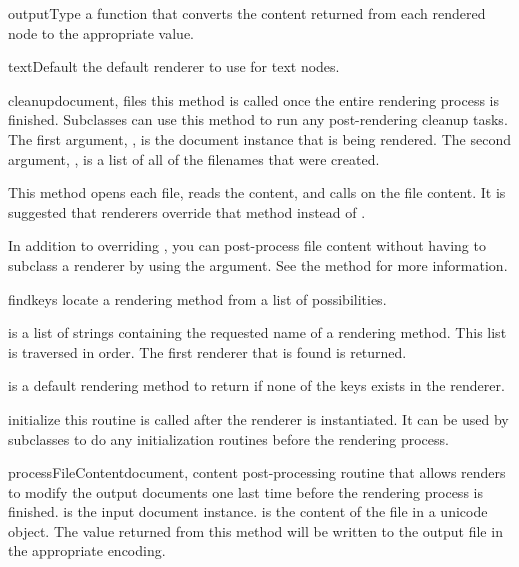\begin{memberdesc}[Renderer]{outputType}
a function that converts the content returned from each rendered
node to the appropriate value.
\end{memberdesc}

\begin{memberdesc}[Renderer]{textDefault}
the default renderer to use for text nodes.
\end{memberdesc}


\begin{methoddesc}[Renderer]{cleanup}{document, files}
this method is called once the entire rendering process is finished.  
Subclasses can use this method to run any post-rendering cleanup tasks.
The first argument, , is the document instance that is
being rendered.  The second argument, , is a list of all of the
filenames that were created.

This method opens each file, reads the content, and 
calls  on the file content.  It is suggested
that renderers override that method instead of .

In addition to overriding , you can post-process
file content without having to subclass a renderer by using the 
 argument.  See the  method for more information.
\end{methoddesc}

\begin{methoddesc}[Renderer]{find}{keys}
locate a rendering method from a list of possibilities.  

 is a list of strings containing the requested name of a
rendering method.  This list is traversed in order.  The first renderer
that is found is returned.

 is a default rendering method to return if none of the keys
exists in the renderer.
\end{methoddesc}

\begin{methoddesc}[Renderer]{initialize}{}
this routine is called after the renderer is instantiated.  It can be used
by subclasses to do any initialization routines before the rendering process.
\end{methoddesc}

\begin{methoddesc}[Renderer]{processFileContent}{document, content}
post-processing routine that allows renders to modify the output documents
one last time before the rendering process is finished.  
is the input document instance.   is the content of the 
file in a unicode object.  The value returned from this method will be
written to the output file in the appropriate encoding.
\end{methoddesc}

